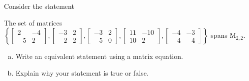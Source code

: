 
\begin{exerciseStatement}


Consider the statement 
\begin{center}\begin{minipage}{0.8\textwidth}
 The set of matrices \( \left\{ \left[\begin{array}{cc}
2 & -4 \\
-5 & 2
\end{array}\right] , \left[\begin{array}{cc}
-3 & 2 \\
-2 & 2
\end{array}\right] , \left[\begin{array}{cc}
-3 & 2 \\
-5 & 0
\end{array}\right] , \left[\begin{array}{cc}
11 & -10 \\
10 & 2
\end{array}\right] , \left[\begin{array}{cc}
-4 & -3 \\
-4 & -4
\end{array}\right] \right\} \) spans \(\mathrm{M}_{2,2}\). 
\end{minipage}\end{center}
    


\begin{enumerate}[(a)]
\item  Write an equivalent statement using a matrix equation.
\item  Explain why your statement is true or false.
\end{enumerate}
    
\end{exerciseStatement}
    
